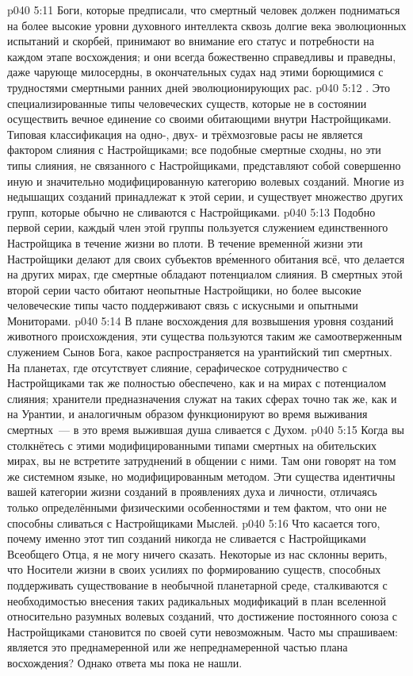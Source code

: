 \vs p040 5:11 \pc Боги, которые предписали, что смертный человек должен подниматься на более высокие уровни духовного интеллекта сквозь долгие века эволюционных испытаний и скорбей, принимают во внимание его статус и потребности на каждом этапе восхождения; и они всегда божественно справедливы и праведны, даже чарующе милосердны, в окончательных судах над этими борющимися с трудностями смертными ранних дней эволюционирующих рас.
\vs p040 5:12 \pc {}. Это специализированные типы человеческих существ, которые не в состоянии осуществить вечное единение со своими обитающими внутри Настройщиками. Типовая классификация на одно\hyp{}, двух\hyp{} и трёхмозговые расы не является фактором слияния с Настройщиками; все подобные смертные сходны, но эти типы слияния, не связанного с Настройщиками, представляют собой совершенно иную и значительно модифицированную категорию волевых созданий. Многие из недышащих созданий принадлежат к этой серии, и существует множество других групп, которые обычно не сливаются с Настройщиками.
\vs p040 5:13 Подобно первой серии, каждый член этой группы пользуется служением единственного Настройщика в течение жизни во плоти. В течение временн\'ой жизни эти Настройщики делают для своих субъектов вр\'еменного обитания всё, что делается на других мирах, где смертные обладают потенциалом слияния. В смертных этой второй серии часто обитают неопытные Настройщики, но более высокие человеческие типы часто поддерживают связь с искусными и опытными Мониторами.
\vs p040 5:14 В плане восхождения для возвышения уровня созданий животного происхождения, эти существа пользуются таким же самоотверженным служением Сынов Бога, какое распространяется на урантийский тип смертных. На планетах, где отсутствует слияние, серафическое сотрудничество с Настройщиками так же полностью обеспечено, как и на мирах с потенциалом слияния; хранители предназначения служат на таких сферах точно так же, как и на Урантии, и аналогичным образом функционируют во время выживания смертных~--- в это время выжившая душа сливается с Духом.
\vs p040 5:15 Когда вы столкнётесь с этими модифицированными типами смертных на обительских мирах, вы не встретите затруднений в общении с ними. Там они говорят на том же системном языке, но модифицированным методом. Эти существа идентичны вашей категории жизни созданий в проявлениях духа и личности, отличаясь только определёнными физическими особенностями и тем фактом, что они не способны сливаться с Настройщиками Мыслей.
\vs p040 5:16 Что касается того, почему именно этот тип созданий никогда не сливается с Настройщиками Всеобщего Отца, я не могу ничего сказать. Некоторые из нас склонны верить, что Носители жизни в своих усилиях по формированию существ, способных поддерживать существование в необычной планетарной среде, сталкиваются с необходимостью внесения таких радикальных модификаций в план вселенной относительно разумных волевых созданий, что достижение постоянного союза с Настройщиками становится по своей сути невозможным. Часто мы спрашиваем: является это преднамеренной или же непреднамеренной частью плана восхождения? Однако ответа мы пока не нашли.
